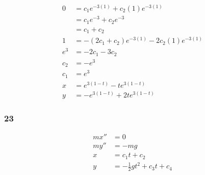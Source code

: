 \documentclass{article}
\begin{document}
\begin{align*}
  0   & = c_1 e^{-3 (1)} + c_2 (1) e^{-3 (1)}              \\
      & = c_1 e^{-3} + c_2 e^{-3}                          \\
      & = c_1 + c_2                                        \\
  1   & = -(2 c_1 + c_2) e^{-3 (1)} - 2 c_2 (1) e^{-3 (1)} \\
  e^3 & = -2 c_1 - 3 c_2                                   \\
  c_2 & = -e^3                                             \\
  c_1 & = e^3                                              \\
  x   & = e^{3 (1 - t)} - t e^{3 (1 - t)}                  \\
  y   & = -e^{3 (1 - t)} + 2 t e^{3 (1 - t)}
\end{align*}

\subsubsection{23}

\begin{align*}
  m x'' & = 0                                \\
  m y'' & = -m g                             \\
  x     & = c_1 t + c_2                      \\
  y     & = -\frac{1}{2} g t^2 + c_3 t + c_4
\end{align*}
\end{document}
